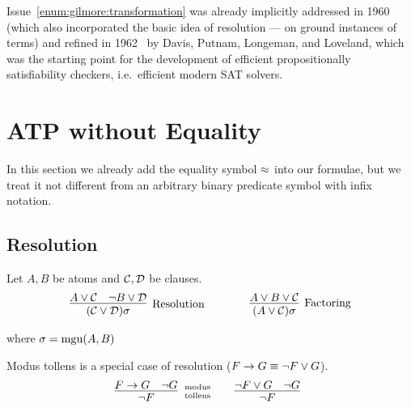 Issue~\ref{enum:gilmore:transformation} was already implicitly
addressed in 1960~\cite{Davis:1960:CPQ:321033.321034}
(which also incorporated the basic idea of resolution --- on ground instances of terms)
and refined in 1962~\cite{Davis:1962:MPT:368273.368557}
by Davis, Putnam, Longeman, and Loveland,
which was the starting point for the development of efficient propositionally satisfiability checkers, i.e.~efficient modern SAT solvers.


\section{ATP without Equality}\label{sec:proving:without:equaltiy}

In this section we already add the equality symbol \( \approx \) into our formulae,
but we treat it not different from an arbitrary binary predicate symbol with infix notation.

\subsection{Resolution}\label{sec:resolution}

\begin{definition}\label{def:resolution}
	Let \( A, B \) be atoms and
	\( \mathcal{C},\mathcal{D} \) be clauses.
	\begin{gather*}
	\infer
	[\text{Resolution}]
	{(\mcC\lor\mcD)\sigma}
	{A\lor\mcC&\lnot B\lor\mcD}
	\qquad\qquad
	\infer
	[\text{Factoring}]
	{(A\lor\mcC)\sigma}
	{A\lor B\lor\mcC}
	\end{gather*}
	\begin{center}
		where
		\( \sigma=\operatorname{mgu}(A,B) \)
	\end{center}
\end{definition}

\begin{example}Modus tollens is a special case of resolution (\( F\rightarrow G\equiv \lnot F\lor G \)).
	\begin{gather*}
	\infer[\text{modus}\atop\text{tollens}]{\lnot F}{F\limp G & \lnot G}
	\qquad
	\infer[]{\lnot F}{\lnot F\lor G & \lnot G}
	\end{gather*}
\end{example}


